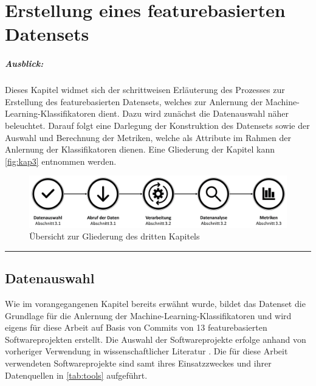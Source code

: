 
\chapter{Erstellung eines featurebasierten Datensets}
\label{dataset}

\paragraph{Ausblick:}
Dieses Kapitel widmet sich der schrittweisen Erläuterung des Prozesses zur Erstellung des featurebasierten Datensets, welches zur Anlernung der Machine-Learning-Klassifikatoren dient. Dazu wird zunächst die Datenauswahl näher beleuchtet. Darauf folgt eine Darlegung der Konstruktion des Datensets sowie der Auswahl und Berechnung der Metriken, welche als Attribute im Rahmen der Anlernung der Klassifikatoren dienen. Eine Gliederung der Kapitel kann \autoref{fig:kap3} entnommen werden.

\begin{figure}[H]
    \centering
    \includegraphics[width=\textwidth]{images/Kap3}
    \caption{Übersicht zur Gliederung des dritten Kapitels\label{fig:kap3}}
\end{figure}

\hrule

\section{Datenauswahl}

Wie im vorangegangenen Kapitel bereits erwähnt wurde, bildet das Datenset die Grundlage für die Anlernung der Machine-Learning-Klassifikatoren und wird eigens für diese Arbeit auf Basis von Commits von 13 featurebasierten Softwareprojekten erstellt. Die Auswahl der Softwareprojekte erfolge anhand von vorheriger Verwendung in wissenschaftlicher Literatur \cite{Hunsen2015,Liebig2010,Queiroz2016}. Die für diese Arbeit verwendeten Softwareprojekte sind samt ihres Einsatzzweckes und ihrer Datenquellen in \autoref{tab:tools} aufgeführt.

